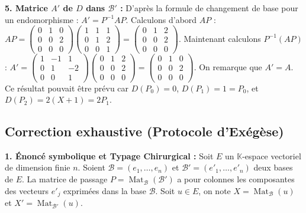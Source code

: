 \documentclass{report}
\begin{document}
\textbf{5. Matrice $A'$ de $D$ dans $\mathcal{B}'$ :}
D'après la formule de changement de base pour un endomorphisme : $A' = P^{-1} A P$.
Calculons d'abord $AP$ :
$AP = \begin{pmatrix} 0 & 1 & 0 \\ 0 & 0 & 2 \\ 0 & 0 & 0 \end{pmatrix} \begin{pmatrix} 1 & 1 & 1 \\ 0 & 1 & 2 \\ 0 & 0 & 1 \end{pmatrix} = \begin{pmatrix} 0 & 1 & 2 \\ 0 & 0 & 2 \\ 0 & 0 & 0 \end{pmatrix}$.
Maintenant calculons $P^{-1}(AP)$ :
$A' = \begin{pmatrix} 1 & -1 & 1 \\ 0 & 1 & -2 \\ 0 & 0 & 1 \end{pmatrix} \begin{pmatrix} 0 & 1 & 2 \\ 0 & 0 & 2 \\ 0 & 0 & 0 \end{pmatrix} = \begin{pmatrix} 0 & 1 & 0 \\ 0 & 0 & 2 \\ 0 & 0 & 0 \end{pmatrix}$.
On remarque que $A' = A$. Ce résultat pouvait être prévu car $D(P_0) = 0$, $D(P_1) = 1 = P_0$, et $D(P_2) = 2(X+1) = 2P_1$.







\subsection*{Correction exhaustive (Protocole d'Exégèse)}

\textbf{1. Énoncé symbolique et Typage Chirurgical :}
Soit $E$ un $\mathbb{K}$-espace vectoriel de dimension finie $n$. Soient $\mathcal{B} = (e_1, \dots, e_n)$ et $\mathcal{B}' = (e'_1, \dots, e'_n)$ deux bases de $E$.
La matrice de passage $P = \operatorname{Mat}_{\mathcal{B}}(\mathcal{B}')$ a pour colonnes les composantes des vecteurs $e'_j$ exprimées dans la base $\mathcal{B}$.
Soit $u \in E$, on note $X = \operatorname{Mat}_{\mathcal{B}}(u)$ et $X' = \operatorname{Mat}_{\mathcal{B}'}(u)$.
\end{document}
